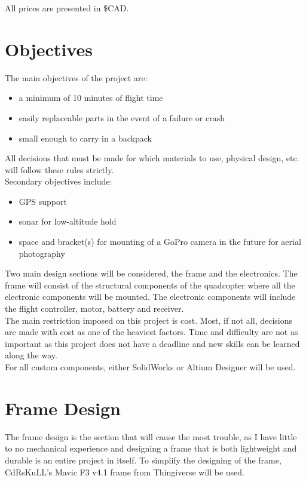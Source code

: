 \documentclass[12pt]{article}
\begin{document}
All prices are presented in \$CAD.

\section{Objectives}

The main objectives of the project are:
\renewcommand{\labelitemi}{\textperiodcentered}
\begin{itemize}
\item a minimum of 10 minutes of flight time
\item easily replaceable parts in the event of a failure or crash
\item small enough to carry in a backpack
\end{itemize}

All decisions that must be made for which materials to use, physical design, etc. will follow these rules strictly.
\\

Secondary objectives include:
\renewcommand{\labelitemi}{\textperiodcentered}
\begin{itemize}
\item GPS support
\item sonar for low-altitude hold
\item space and bracket(s) for mounting of a GoPro camera in the future for aerial photography
\end{itemize}

Two main design sections will be considered, the frame and the electronics. The frame will consist of the structural components of the quadcopter where all the electronic components will be mounted. The electronic components will include the flight controller, motor, battery and receiver. 
\\

The main restriction imposed on this project is cost. Most, if not all, decisions are made with cost as one of the heaviest factors. Time and difficulty are not as important as this project does not have a deadline and new skills can be learned along the way.
\\

For all custom components, either SolidWorks or Altium Designer will be used.

\section{Frame Design}

The frame design is the section that will cause the most trouble, as I have little to no mechanical experience and designing a frame that is both lightweight and durable is an entire project in itself. To simplify the designing of the frame, CdRsKuLL's Mavic F3 v4.1 frame from Thingiverse will be used.
\end{document}
